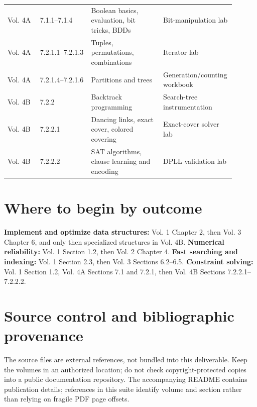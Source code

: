 \documentclass[11pt,letterpaper]{article}
\begin{document}
\begin{longtable}{@{}p{0.14\linewidth}p{0.22\linewidth}>{\raggedright\arraybackslash}p{0.31\linewidth}>{\raggedright\arraybackslash}p{0.23\linewidth}@{}}
Vol. 4A & 7.1.1--7.1.4 & Boolean basics, evaluation, bit tricks, BDDs & Bit-manipulation lab\\
Vol. 4A & 7.2.1.1--7.2.1.3 & Tuples, permutations, combinations & Iterator lab\\
Vol. 4A & 7.2.1.4--7.2.1.6 & Partitions and trees & Generation/counting workbook\\
Vol. 4B & 7.2.2 & Backtrack programming & Search-tree instrumentation\\
Vol. 4B & 7.2.2.1 & Dancing links, exact cover, colored covering & Exact-cover solver lab\\
Vol. 4B & 7.2.2.2 & SAT algorithms, clause learning and encoding & DPLL validation lab\\
\bottomrule
\end{longtable}
\normalsize
\section{Where to begin by outcome}
\textbf{Implement and optimize data structures:} Vol. 1 Chapter 2, then Vol. 3 Chapter 6, and only then specialized structures in Vol. 4B. \textbf{Numerical reliability:} Vol. 1 Section 1.2, then Vol. 2 Chapter 4. \textbf{Fast searching and indexing:} Vol. 1 Section 2.3, then Vol. 3 Sections 6.2--6.5. \textbf{Constraint solving:} Vol. 1 Section 1.2, Vol. 4A Sections 7.1 and 7.2.1, then Vol. 4B Sections 7.2.2.1--7.2.2.2.
\section{Source control and bibliographic provenance}
The source files are external references, not bundled into this deliverable. Keep the volumes in an authorized location; do not check copyright-protected copies into a public documentation repository. The accompanying README contains publication details; references in this suite identify volume and section rather than relying on fragile PDF page offsets.
\end{document}
